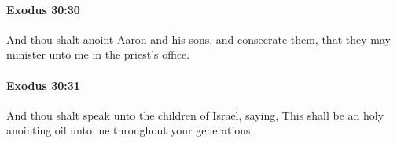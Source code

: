 		\paragraph{Exodus 30:30} %
			\label{EXODUS-30-30}

			And thou shalt anoint Aaron and his sons, and consecrate them, that they may minister unto me in the priest's office.


		\paragraph{Exodus 30:31} %
			\label{EXODUS-30-31}

			And thou shalt speak unto the children of Israel, saying, This shall be an holy anointing oil unto me throughout your generations.



